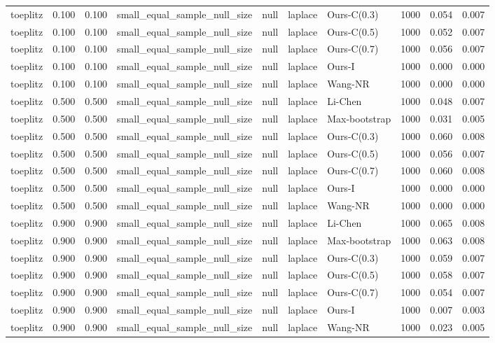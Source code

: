 \begin{tabular}{lrrllllrrr}
toeplitz & 0.100 & 0.100 & small\_equal\_sample\_null\_size & null & laplace & Ours-C(0.3) & 1000 & 0.054 & 0.007 \\
toeplitz & 0.100 & 0.100 & small\_equal\_sample\_null\_size & null & laplace & Ours-C(0.5) & 1000 & 0.052 & 0.007 \\
toeplitz & 0.100 & 0.100 & small\_equal\_sample\_null\_size & null & laplace & Ours-C(0.7) & 1000 & 0.056 & 0.007 \\
toeplitz & 0.100 & 0.100 & small\_equal\_sample\_null\_size & null & laplace & Ours-I & 1000 & 0.000 & 0.000 \\
toeplitz & 0.100 & 0.100 & small\_equal\_sample\_null\_size & null & laplace & Wang-NR & 1000 & 0.000 & 0.000 \\
toeplitz & 0.500 & 0.500 & small\_equal\_sample\_null\_size & null & laplace & Li-Chen & 1000 & 0.048 & 0.007 \\
toeplitz & 0.500 & 0.500 & small\_equal\_sample\_null\_size & null & laplace & Max-bootstrap & 1000 & 0.031 & 0.005 \\
toeplitz & 0.500 & 0.500 & small\_equal\_sample\_null\_size & null & laplace & Ours-C(0.3) & 1000 & 0.060 & 0.008 \\
toeplitz & 0.500 & 0.500 & small\_equal\_sample\_null\_size & null & laplace & Ours-C(0.5) & 1000 & 0.056 & 0.007 \\
toeplitz & 0.500 & 0.500 & small\_equal\_sample\_null\_size & null & laplace & Ours-C(0.7) & 1000 & 0.060 & 0.008 \\
toeplitz & 0.500 & 0.500 & small\_equal\_sample\_null\_size & null & laplace & Ours-I & 1000 & 0.000 & 0.000 \\
toeplitz & 0.500 & 0.500 & small\_equal\_sample\_null\_size & null & laplace & Wang-NR & 1000 & 0.000 & 0.000 \\
toeplitz & 0.900 & 0.900 & small\_equal\_sample\_null\_size & null & laplace & Li-Chen & 1000 & 0.065 & 0.008 \\
toeplitz & 0.900 & 0.900 & small\_equal\_sample\_null\_size & null & laplace & Max-bootstrap & 1000 & 0.063 & 0.008 \\
toeplitz & 0.900 & 0.900 & small\_equal\_sample\_null\_size & null & laplace & Ours-C(0.3) & 1000 & 0.059 & 0.007 \\
toeplitz & 0.900 & 0.900 & small\_equal\_sample\_null\_size & null & laplace & Ours-C(0.5) & 1000 & 0.058 & 0.007 \\
toeplitz & 0.900 & 0.900 & small\_equal\_sample\_null\_size & null & laplace & Ours-C(0.7) & 1000 & 0.054 & 0.007 \\
toeplitz & 0.900 & 0.900 & small\_equal\_sample\_null\_size & null & laplace & Ours-I & 1000 & 0.007 & 0.003 \\
toeplitz & 0.900 & 0.900 & small\_equal\_sample\_null\_size & null & laplace & Wang-NR & 1000 & 0.023 & 0.005 \\
\bottomrule
\end{tabular}
